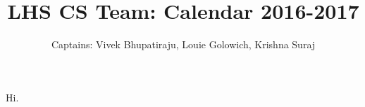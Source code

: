 \documentclass[11pt, oneside]{article}   	%
\title{LHS CS Team: Calendar 2016-2017}
\author{Captains: Vivek Bhupatiraju, Louie Golowich, Krishna Suraj}
\begin{document}
\maketitle
Hi.
\end{document}
